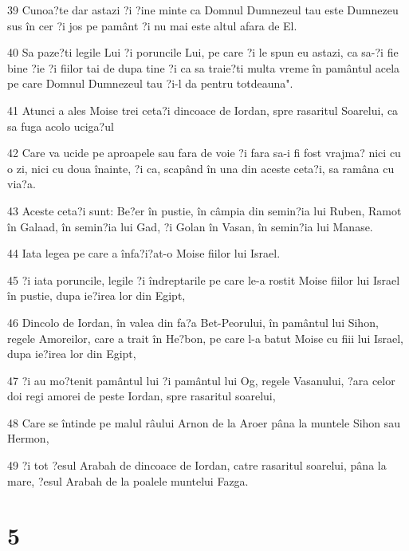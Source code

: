 \par 39 Cunoa?te dar astazi ?i ?ine minte ca Domnul Dumnezeul tau este Dumnezeu sus în cer ?i jos pe pamânt ?i nu mai este altul afara de El.
\par 40 Sa paze?ti legile Lui ?i poruncile Lui, pe care ?i le spun eu astazi, ca sa-?i fie bine ?ie ?i fiilor tai de dupa tine ?i ca sa traie?ti multa vreme în pamântul acela pe care Domnul Dumnezeul tau ?i-l da pentru totdeauna".
\par 41 Atunci a ales Moise trei ceta?i dincoace de Iordan, spre rasaritul Soarelui, ca sa fuga acolo uciga?ul
\par 42 Care va ucide pe aproapele sau fara de voie ?i fara sa-i fi fost vrajma? nici cu o zi, nici cu doua înainte, ?i ca, scapând în una din aceste ceta?i, sa ramâna cu via?a.
\par 43 Aceste ceta?i sunt: Be?er în pustie, în câmpia din semin?ia lui Ruben, Ramot în Galaad, în semin?ia lui Gad, ?i Golan în Vasan, în semin?ia lui Manase.
\par 44 Iata legea pe care a înfa?i?at-o Moise fiilor lui Israel.
\par 45 ?i iata poruncile, legile ?i îndreptarile pe care le-a rostit Moise fiilor lui Israel în pustie, dupa ie?irea lor din Egipt,
\par 46 Dincolo de Iordan, în valea din fa?a Bet-Peorului, în pamântul lui Sihon, regele Amoreilor, care a trait în He?bon, pe care l-a batut Moise cu fiii lui Israel, dupa ie?irea lor din Egipt,
\par 47 ?i au mo?tenit pamântul lui ?i pamântul lui Og, regele Vasanului, ?ara celor doi regi amorei de peste Iordan, spre rasaritul soarelui,
\par 48 Care se întinde pe malul râului Arnon de la Aroer pâna la muntele Sihon sau Hermon,
\par 49 ?i tot ?esul Arabah de dincoace de Iordan, catre rasaritul soarelui, pâna la mare, ?esul Arabah de la poalele muntelui Fazga.

\chapter{5}

